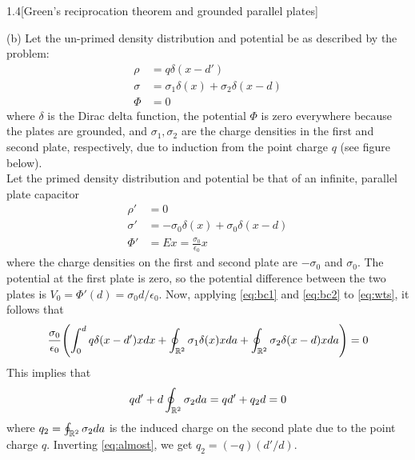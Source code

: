 \documentclass[12pt]{article}
\begin{document}
\begin{problem}{1.4}[Green's reciprocation theorem and grounded
    parallel plates]
\begin{solution}
    (b) Let the un-primed density distribution and potential be as described by
    the problem:
    \begin{subequations}\label{eq:bc1}
        \begin{align}
            \rho&=q\delta(x-d')\\
            \sigma&=\sigma_1\delta(x)+\sigma_2\delta(x-d)\\
            \Phi&=0
        \end{align} 
    \end{subequations}
    where $\delta$ is the Dirac delta function, the potential $\Phi$ is zero
    everywhere because the plates are grounded, and $\sigma_1,\sigma_2$ are
    the charge densities in the first and second plate, respectively, due to
    induction from the point charge $q$ (see figure below).\\[2in]

    Let the primed density distribution and potential be that of an
    infinite, parallel plate capacitor
    \begin{subequations}\label{eq:bc2}
        \begin{align}
            \rho'&=0\\
            \sigma'&=-\sigma_0\delta(x)+\sigma_0\delta(x-d)\\
            \Phi'&=Ex=\frac{\sigma_0}{\epsilon_0}x
        \end{align} 
    \end{subequations}
    where the charge densities on the first and second plate are $-\sigma_0$ and
    $\sigma_0$. The potential at the first plate is zero, so the potential
    difference between the two plates is $V_0=\Phi'(d)=\sigma_0 d/\epsilon_0$.
    Now, applying \eqref{eq:bc1} and \eqref{eq:bc2} to \eqref{eq:wts}, it 
    follows that
    \begin{equation}
        \frac{\sigma_0}{\epsilon_0}\qty(\int_0^d q\delta(x-d')xdx
        +\oint_{\mathbb{R}^2}\sigma_1\delta(x)x da
        +\oint_{\mathbb{R}^2}\sigma_2\delta(x-d)xda)=0
    \end{equation}
    This implies that
    \begin{equation}\label{eq:almost}
        qd'+d\oint_{\mathbb{R}^2}\sigma_2da=qd'+q_2d=0
    \end{equation}
    where $q_2=\oint_{\mathbb{R}^2}\sigma_2da$ is the induced charge on the
    second plate due to the point charge $q$. Inverting \eqref{eq:almost}, we 
    get $q_2=(-q)(d'/d)$.
\end{solution}
    
\end{problem}
\end{document}
